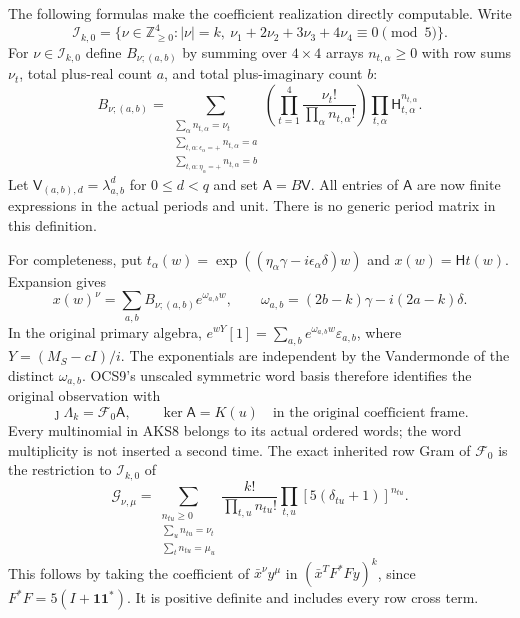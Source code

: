 \documentclass[11pt,a4paper]{article}
\begin{document}
The following formulas make the coefficient realization directly
computable. Write
\[
 \mathcal I_{k,0}=\{\nu\in\mathbb Z_{\ge0}^4:|\nu|=k,
                         \ \nu_1+2\nu_2+3\nu_3+4\nu_4\equiv0\pmod5\}.
\]
For $\nu\in\mathcal I_{k,0}$ define $B_{\nu;(a,b)}$ by summing over
$4\times4$ arrays $n_{t,\alpha}\ge0$ with row sums $\nu_t$, total plus-real
count $a$, and total plus-imaginary count $b$:
\[
 B_{\nu;(a,b)}=
 \sum_{\substack{\sum_\alpha n_{t,\alpha}=\nu_t\\
       \sum_{t,\alpha:\epsilon_\alpha=+}n_{t,\alpha}=a\\
       \sum_{t,\alpha:\eta_\alpha=+}n_{t,\alpha}=b}}
 \left(\prod_{t=1}^4\frac{\nu_t!}{\prod_\alpha n_{t,\alpha}!}\right)
                  \prod_{t,\alpha}\mathsf H_{t,\alpha}^{n_{t,\alpha}}.
 \tag{AKS8}
\]
Let $\mathsf V_{(a,b),d}=\lambda_{a,b}^d$ for $0\le d<q$ and set
$\mathsf A=B\mathsf V$. All entries of $\mathsf A$ are now finite
expressions in the actual periods and unit. There is no generic period
matrix in this definition.

For completeness, put $t_\alpha(w)=\exp((\eta_\alpha\gamma-
 i\epsilon_\alpha\delta)w)$ and $x(w)=\mathsf Ht(w)$. Expansion gives
\[
 x(w)^\nu=\sum_{a,b}B_{\nu;(a,b)}e^{\omega_{a,b}w},\qquad
 \omega_{a,b}=(2b-k)\gamma-i(2a-k)\delta.
\]
In the original primary algebra,
$e^{wY}[1]=\sum_{a,b}e^{\omega_{a,b}w}\varepsilon_{a,b}$, where
$Y=(M_S-cI)/i$. The exponentials are independent by the Vandermonde of
the distinct $\omega_{a,b}$. OCS9's unscaled symmetric word basis
therefore identifies the original observation with
\[
       \jmath\Lambda_k=\mathcal F_0\mathsf A,
       \qquad\ker\mathsf A=K(u)
       \quad\text{in the original coefficient frame.}
       \tag{AKS9}
\]
Every multinomial in AKS8 belongs to its actual ordered words; the
word multiplicity is not inserted a second time. The exact inherited
row Gram of $\mathcal F_0$ is the restriction to $\mathcal I_{k,0}$ of
\[
 \mathcal G_{\nu,\mu}=
 \sum_{\substack{n_{tu}\ge0\\\sum_u n_{tu}=\nu_t\\
                              \sum_t n_{tu}=\mu_u}}
 \frac{k!}{\prod_{t,u}n_{tu}!}\prod_{t,u}
          [5(\delta_{tu}+1)]^{n_{tu}}.
 \tag{AKS10}
\]
This follows by taking the coefficient of $\bar x^\nu y^\mu$ in
$(\bar x^TF^*Fy)^k$, since $F^*F=5(I+\mathbf1\mathbf1^*)$. It is positive
definite and includes every row cross term.
\end{document}
